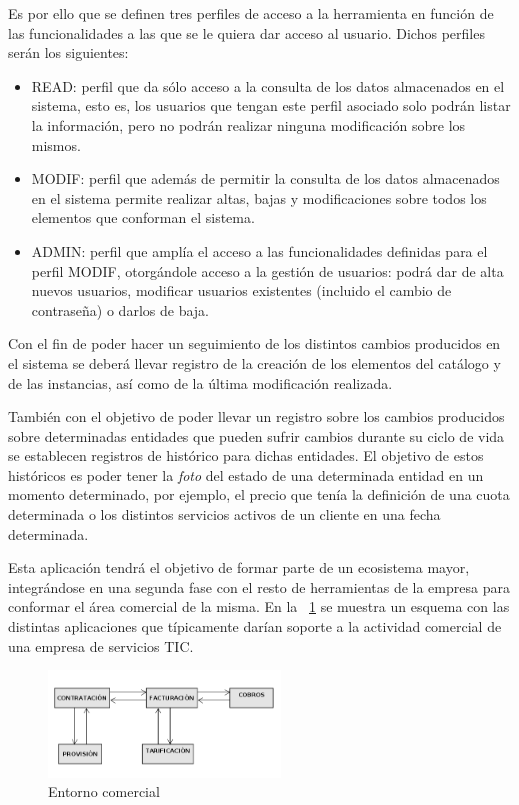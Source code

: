 Es por ello que se definen tres perfiles de acceso a la herramienta en función de las funcionalidades a las que se le quiera dar acceso al usuario. Dichos perfiles serán los siguientes:
\begin{itemize}
\item READ: perfil que da sólo acceso a la consulta de los datos almacenados en el sistema, esto es, los usuarios que tengan este perfil asociado solo podrán listar la información, pero no podrán realizar ninguna modificación sobre los mismos.
\item MODIF: perfil que además de permitir la consulta de los datos almacenados en el sistema permite realizar altas, bajas y modificaciones sobre todos los elementos que conforman el sistema.
\item ADMIN: perfil que amplía el acceso a las funcionalidades definidas para el perfil MODIF, otorgándole acceso a la gestión de usuarios: podrá dar de alta nuevos usuarios, modificar usuarios existentes (incluido el cambio de contraseña) o darlos de baja.
\end{itemize}


Con el fin de poder hacer un seguimiento de los distintos cambios producidos en el sistema se deberá llevar registro de la creación de los elementos  del catálogo y de las instancias, así como de la última modificación realizada.

También con el objetivo de poder llevar un registro sobre los cambios producidos sobre determinadas entidades que pueden sufrir cambios durante su ciclo de vida se establecen registros de histórico para dichas entidades. El objetivo de estos históricos es poder tener la \textit{foto} del estado de una determinada entidad en un momento determinado, por ejemplo, el precio que tenía la definición de una cuota determinada o los distintos servicios activos de un cliente en una fecha determinada.


Esta aplicación tendrá el objetivo de formar parte de un ecosistema mayor, integrándose en una segunda fase con el resto de herramientas de la empresa para conformar el área comercial de la misma. En la \figurename~\ref{fig:area-comercial} se muestra un esquema con las distintas aplicaciones que típicamente darían soporte a la actividad comercial de una empresa de servicios TIC.

\begin{figure}
  \centering
  \includegraphics[width=0.55\textwidth]{imaxes/area-comercial.png}
  \caption{Entorno comercial}
  \label{fig:area-comercial}
\end{figure}


